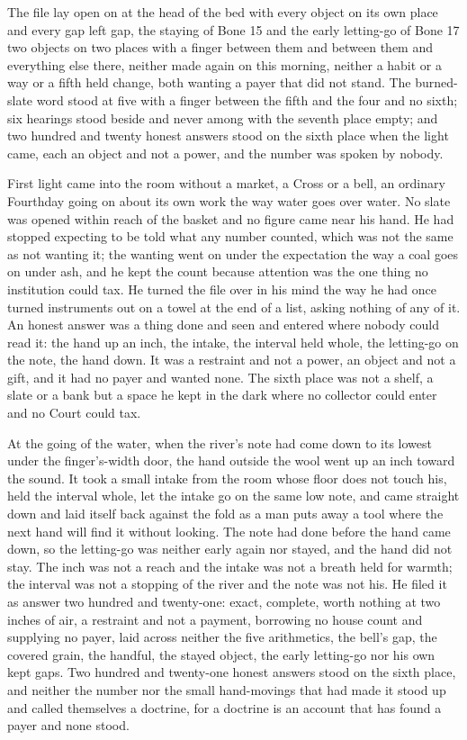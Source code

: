 The file lay open on  at the head of the bed with every object on its own place and every gap left gap, the staying of Bone 15 and the early letting-go of Bone 17 two objects on two places with a finger between them and between them and everything else there, neither made again on this morning, neither a habit or a way or a fifth held change, both wanting a payer that did not stand. The burned-slate word stood at five with a finger between the fifth and the four and no sixth; six hearings stood beside and never among with the seventh place empty; and two hundred and twenty honest answers stood on the sixth place when the light came, each an object and not a power, and the number was spoken by nobody.

\scenebreak

First light came into the room without a market, a Cross or a bell, an ordinary Fourthday going on about its own work the way water goes over water. No slate was opened within reach of the basket and no figure came near his hand. He had stopped expecting to be told what any number counted, which was not the same as not wanting it; the wanting went on under the expectation the way a coal goes on under ash, and he kept the count because attention was the one thing no institution could tax. He turned the file over in his mind the way he had once turned instruments out on a towel at the end of a list, asking nothing of any of it. An honest answer was a thing done and seen and entered where nobody could read it: the hand up an inch, the intake, the interval held whole, the letting-go on the note, the hand down. It was a restraint and not a power, an object and not a gift, and it had no payer and wanted none. The sixth place was not a shelf, a slate or a bank but a space he kept in the dark where no collector could enter and no Court could tax.

At the going of the water, when the river's note had come down to its lowest under the finger's-width door, the hand outside the wool went up an inch toward the sound. It took a small intake from the room whose floor does not touch his, held the interval whole, let the intake go on the same low note, and came straight down and laid itself back against the fold as a man puts away a tool where the next hand will find it without looking. The note had done before the hand came down, so the letting-go was neither early again nor stayed, and the hand did not stay. The inch was not a reach and the intake was not a breath held for warmth; the interval was not a stopping of the river and the note was not his. He filed it as answer two hundred and twenty-one: exact, complete, worth nothing at two inches of air, a restraint and not a payment, borrowing no house count and supplying no payer, laid across neither the five arithmetics, the bell's gap, the covered grain, the handful, the stayed object, the early letting-go nor his own kept gaps. Two hundred and twenty-one honest answers stood on the sixth place, and neither the number nor the small hand-movings that had made it stood up and called themselves a doctrine, for a doctrine is an account that has found a payer and none stood.

